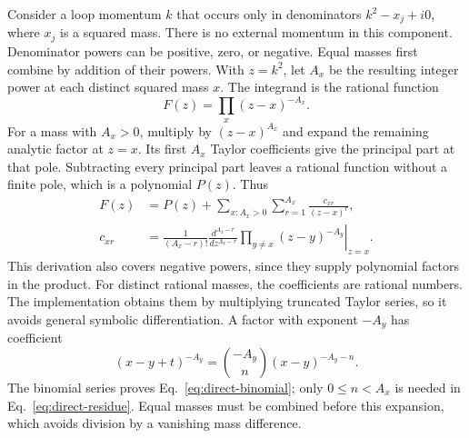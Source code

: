 Consider a loop momentum $k$ that occurs only in denominators $k^2-x_j+i0$, where $x_j$ is a squared mass. There is no external momentum in this component. Denominator powers can be positive, zero, or negative. Equal masses first combine by addition of their powers. With $z=k^2$, let $A_x$ be the resulting integer power at each distinct squared mass $x$. The integrand is the rational function
\begin{equation}
 F(z)=\prod_x(z-x)^{-A_x}.
 \label{eq:direct-rational}
\end{equation}
For a mass with $A_x>0$, multiply by $(z-x)^{A_x}$ and expand the remaining analytic factor at $z=x$. Its first $A_x$ Taylor coefficients give the principal part at that pole. Subtracting every principal part leaves a rational function without a finite pole, which is a polynomial $P(z)$. Thus
\begin{align}
 F(z)&=P(z)+\sum_{x:A_x>0}\sum_{r=1}^{A_x}\frac{c_{xr}}{(z-x)^r},\label{eq:direct-apart}\\
 c_{xr}&=\left.\frac{1}{(A_x-r)!}\frac{d^{A_x-r}}{dz^{A_x-r}}
 \prod_{y\ne x}(z-y)^{-A_y}\right|_{z=x}.\label{eq:direct-residue}
\end{align}
This derivation also covers negative powers, since they supply polynomial factors in the product. For distinct rational masses, the coefficients are rational numbers. The implementation obtains them by multiplying truncated Taylor series, so it avoids general symbolic differentiation. A factor with exponent $-A_y$ has coefficient
\begin{equation}
 [t^n](x-y+t)^{-A_y}=\binom{-A_y}{n}(x-y)^{-A_y-n}.
 \label{eq:direct-binomial}
\end{equation}
The binomial series proves Eq.~\eqref{eq:direct-binomial}; only $0\leq n<A_x$ is needed in Eq.~\eqref{eq:direct-residue}. Equal masses must be combined before this expansion, which avoids division by a vanishing mass difference.

